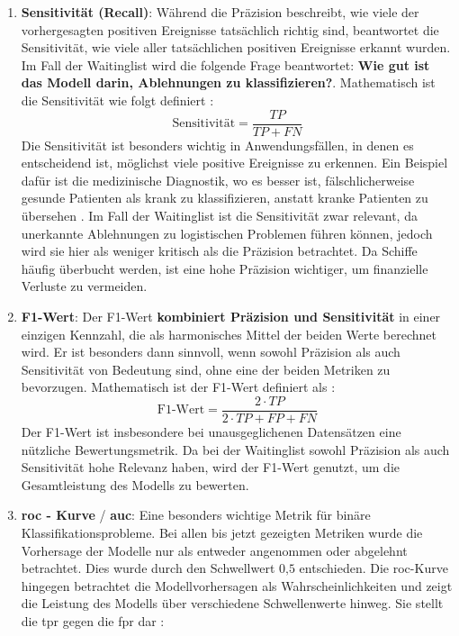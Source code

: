 \begin{enumerate}
    \item \textbf{Sensitivität (Recall)}: Während die Präzision beschreibt, wie viele der vorhergesagten positiven Ereignisse tatsächlich richtig sind, beantwortet die Sensitivität, wie viele aller tatsächlichen positiven Ereignisse erkannt wurden. 
    Im Fall der Waitinglist wird die folgende Frage beantwortet: \textbf{Wie gut ist das Modell darin, Ablehnungen zu klassifizieren?}. Mathematisch ist die Sensitivität wie folgt definiert \cite{Swaminathan2024}: \[\text{Sensitivität}=\frac{TP}{TP + FN}\] 
    Die Sensitivität ist besonders wichtig in Anwendungsfällen, in denen es entscheidend ist, möglichst viele positive Ereignisse zu erkennen. Ein Beispiel dafür ist die medizinische Diagnostik, wo es besser ist, fälschlicherweise gesunde Patienten als krank zu klassifizieren, anstatt kranke Patienten zu übersehen \cite{Hastie2009}.
    Im Fall der Waitinglist ist die Sensitivität zwar relevant, da unerkannte Ablehnungen zu logistischen Problemen führen können, jedoch wird sie hier als weniger kritisch als die Präzision betrachtet. Da Schiffe häufig überbucht werden, ist eine hohe Präzision wichtiger, um finanzielle Verluste zu vermeiden.
    
    \item \textbf{F1-Wert}: Der F1-Wert \textbf{kombiniert Präzision und Sensitivität} in einer einzigen Kennzahl, die als harmonisches Mittel der beiden Werte berechnet wird. Er ist besonders dann sinnvoll, wenn sowohl Präzision als auch Sensitivität von Bedeutung sind, ohne eine der beiden Metriken zu bevorzugen. Mathematisch ist der F1-Wert definiert als \cite{Swaminathan2024}: \[\text{F1-Wert}=\frac{2 \cdot TP}{2 \cdot TP + FP + FN}\]
    Der F1-Wert ist insbesondere bei unausgeglichenen Datensätzen eine nützliche Bewertungsmetrik. Da bei der Waitinglist sowohl Präzision als auch Sensitivität hohe Relevanz haben, wird der F1-Wert genutzt, um die Gesamtleistung des Modells zu bewerten. 

    \item \textbf{\gls{roc} - Kurve} / \textbf{\gls{auc}}: Eine besonders wichtige Metrik für binäre Klassifikationsprobleme. Bei allen bis jetzt gezeigten Metriken wurde die Vorhersage der Modelle nur als entweder angenommen oder abgelehnt betrachtet. Dies wurde durch den Schwellwert $0\text{,}5$ entschieden.  
    Die \gls{roc}-Kurve hingegen betrachtet die Modellvorhersagen als Wahrscheinlichkeiten und zeigt die Leistung des Modells über verschiedene Schwellenwerte hinweg. Sie stellt die \gls{tpr} gegen die \gls{fpr} dar \cite{Swaminathan2024}:


\end{enumerate}
